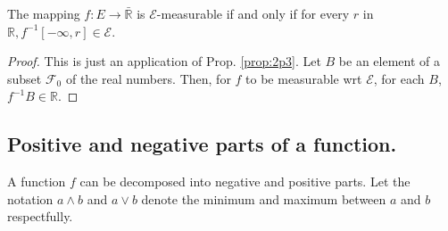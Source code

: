 \begin{definition}
	The mapping $f:E\rightarrow \bar{\mathbb{R}}$ is $\mathcal{E}$-measurable if and only if for every $r$ in $\mathbb{R}, f^{-1}[-\infty, r] \in \mathcal{E}$.
	\begin{proof}
		This is just an application of Prop. \ref{prop:2p3}. Let $B$ be an element of a subset $\mathcal{F}_0$ of the real numbers. Then, for $f$ to be measurable wrt $\mathcal{E}$, for each $B$, $f^{-1}B\in \mathbb{R}$.
	\end{proof}
\end{definition}

\subsection{Positive and negative parts of a function.}

A function $f$ can be decomposed into negative and positive parts. Let the notation $a \wedge b$ and $a\vee b$ denote the minimum and maximum between $a$ and $b$ respectfully. 

